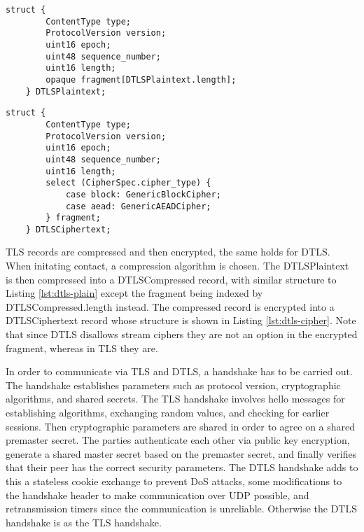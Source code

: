 \documentclass[0-thesis.tex]{subfiles}
\begin{document}
\lstset{language=C}
\begin{lstlisting}[caption={The DTLS plaintext record structure.}, label={lst:dtls-plain}]
    struct {
        ContentType type;
        ProtocolVersion version;
        uint16 epoch;
        uint48 sequence_number;
        uint16 length;
        opaque fragment[DTLSPlaintext.length];
    } DTLSPlaintext;
\end{lstlisting}

\begin{lstlisting}[caption={The DTLS ciphertext record structure.}, label={lst:dtls-cipher}]
    struct {
        ContentType type;
        ProtocolVersion version;
        uint16 epoch;
        uint48 sequence_number;
        uint16 length;
        select (CipherSpec.cipher_type) {
            case block: GenericBlockCipher;
            case aead: GenericAEADCipher;
        } fragment;
    } DTLSCiphertext;
\end{lstlisting}

TLS records are compressed and then encrypted, the same holds for DTLS. When initating 
contact, a compression algorithm is chosen. The DTLSPlaintext is then compressed into a 
DTLSCompressed record, with similar structure to Listing \ref{lst:dtls-plain} except the 
fragment being indexed by DTLSCompressed.length instead. The compressed record is 
encrypted into a DTLSCiphertext record whose structure is shown in Listing \ref{lst:dtls-cipher}.
Note that since DTLS disallows stream ciphers they are not an option in the encrypted fragment,
whereas in TLS they are.

In order to communicate via TLS and DTLS, a handshake has to be carried out. The handshake 
establishes parameters such as protocol version, cryptographic algorithms, and shared 
secrets. The TLS handshake involves hello messages for establishing algorithms, exchanging 
random values, and checking for earlier sessions. Then cryptographic parameters are shared in 
order to agree on a shared premaster secret. The parties authenticate each other via public 
key encryption, generate a shared master secret based on the premaster secret, and finally 
verifies that their peer has the correct security parameters. The DTLS handshake adds to this 
a stateless cookie exchange to prevent DoS attacks, some modifications to the handshake 
header to make communication over UDP possible, and retransmission timers since the communication 
is unreliable. Otherwise the DTLS handshake is as the TLS handshake.
\end{document}
